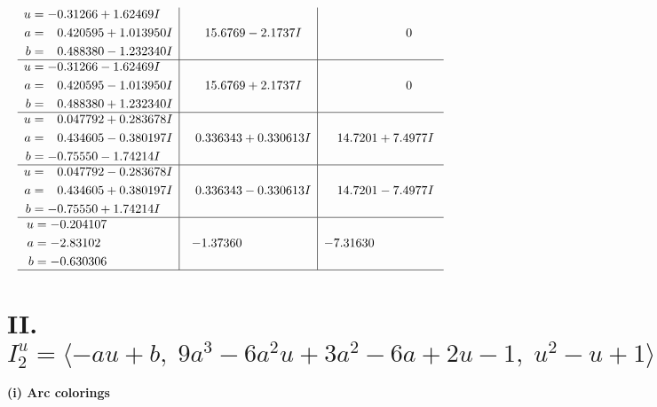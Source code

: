 \documentclass[1p]{elsarticle_modified}
\theoremstyle{definition}
\begin{document}
$$\begin{array}{c|c|c}
\begin{aligned}
u &= -0.31266 + 1.62469 I \\
a &= \phantom{-}0.420595 + 1.013950 I \\
b &= \phantom{-}0.488380 - 1.232340 I\end{aligned}
 & \phantom{-}15.6769 - 2.1737 I & \phantom{-0.000000 } 0 \\ \hline\begin{aligned}
u &= -0.31266 - 1.62469 I \\
a &= \phantom{-}0.420595 - 1.013950 I \\
b &= \phantom{-}0.488380 + 1.232340 I\end{aligned}
 & \phantom{-}15.6769 + 2.1737 I & \phantom{-0.000000 } 0 \\ \hline\begin{aligned}
u &= \phantom{-}0.047792 + 0.283678 I \\
a &= \phantom{-}0.434605 - 0.380197 I \\
b &= -0.75550 - 1.74214 I\end{aligned}
 & \phantom{-}0.336343 + 0.330613 I & \phantom{-}14.7201 + 7.4977 I \\ \hline\begin{aligned}
u &= \phantom{-}0.047792 - 0.283678 I \\
a &= \phantom{-}0.434605 + 0.380197 I \\
b &= -0.75550 + 1.74214 I\end{aligned}
 & \phantom{-}0.336343 - 0.330613 I & \phantom{-}14.7201 - 7.4977 I \\ \hline\begin{aligned}
u &= -0.204107\phantom{ +0.000000I} \\
a &= -2.83102\phantom{ +0.000000I} \\
b &= -0.630306\phantom{ +0.000000I}\end{aligned}
 & -1.37360\phantom{ +0.000000I} & -7.31630\phantom{ +0.000000I}\\
 \hline 
 \end{array}$$\newpage\newpage\renewcommand{\arraystretch}{1}
\centering \section*{II. $I^u_{2}= \langle - a u+b,\;9 a^3-6 a^2 u+3 a^2-6 a+2 u-1,\;u^2- u+1 \rangle$}
\flushleft \textbf{(i) Arc colorings}\\
\end{document}
